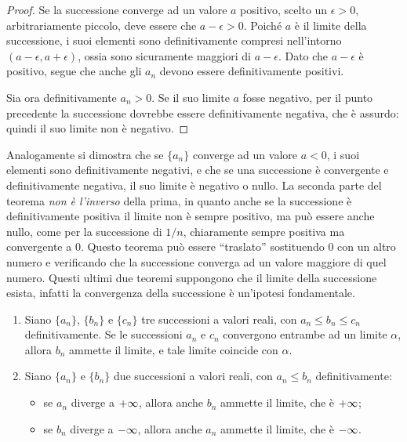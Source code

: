 \begin{proof}
Se la successione converge ad un valore $a$ positivo, scelto un $\epsilon>0$, arbitrariamente piccolo,  deve essere che $a-\epsilon>0$. Poiché $a$ è il limite della successione, i suoi elementi sono definitivamente compresi nell'intorno $(a-\epsilon,a+\epsilon)$, ossia sono sicuramente maggiori di $a-\epsilon$. Dato che $a-\epsilon$ è positivo, segue che anche gli $a_n$ devono essere definitivamente positivi.

Sia ora definitivamente $a_n>0$. Se il suo limite $a$ fosse negativo, per il punto precedente la successione dovrebbe essere definitivamente negativa, che è assurdo: quindi il suo limite non è negativo.
\end{proof}
Analogamente si dimostra che se $\{a_n\}$ converge ad un valore $a<0$, i suoi elementi sono definitivamente negativi, e che se una successione è convergente e definitivamente negativa, il suo limite è negativo o nullo.
La seconda parte del teorema \emph{non è l'inverso} della prima, in quanto anche se la successione è definitivamente positiva il limite non è sempre positivo, ma può essere anche nullo, come per la successione di $1/n$, chiaramente sempre positiva ma convergente a 0.
Questo teorema può essere ``traslato'' sostituendo 0 con un altro numero e verificando che la successione converga ad un valore maggiore di quel numero.
Questi ultimi due teoremi suppongono che il limite della successione esista, infatti la convergenza della successione è un'ipotesi fondamentale.
\begin{teorema}
\label{t:confronto}
\begin{enumerate}
\item Siano $\{a_n\}$, $\{b_n\}$ e $\{c_n\}$ tre successioni a valori reali, con $a_n\leq b_n\leq c_n$ definitivamente. Se le successioni $a_n$ e $c_n$ convergono entrambe ad un limite $\alpha$, allora $b_n$ ammette il limite, e tale limite coincide con $\alpha$.
\item Siano $\{a_n\}$ e $\{b_n\}$ due successioni a valori reali, con $a_n\leq b_n$ definitivamente:
	\begin{itemize}
		\item se $a_n$ diverge a $+\infty$, allora anche $b_n$ ammette il limite, che è $+\infty$;
		\item se $b_n$ diverge a $-\infty$, allora anche $a_n$ ammette il limite, che è $-\infty$.
	\end{itemize}
\end{enumerate}
\end{teorema}
